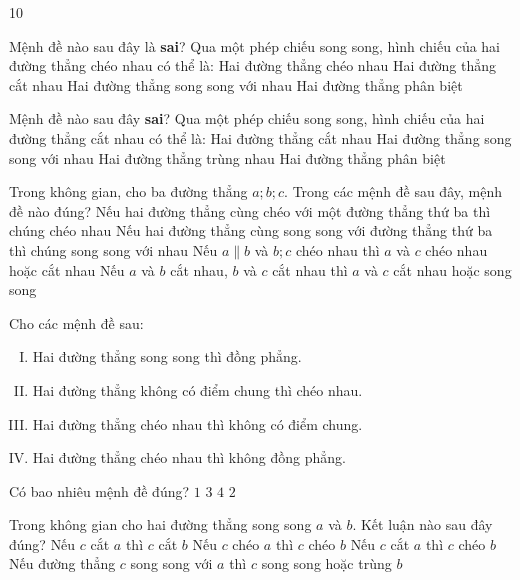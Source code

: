 \begin{indapan}{10}
\begin{ex}
	\loigiai{
	}
\end{ex}
\begin{ex}%
	Mệnh đề nào sau đây là \textbf{sai}? Qua một phép chiếu song song, hình chiếu của hai đường thẳng chéo nhau có thể là:
	\choice
	{\True Hai đường thẳng chéo nhau}
	{Hai đường thẳng cắt nhau}
	{Hai đường thẳng song song với nhau}
	{Hai đường thẳng phân biệt}
	\loigiai{
	}
\end{ex}
\begin{ex}%
	Mệnh đề nào sau đây \textbf{sai}? Qua một phép chiếu song song, hình chiếu của hai đường thẳng cắt nhau có thể là:
	\choice
	{Hai đường thẳng cắt nhau}
	{\True Hai đường thẳng song song với nhau}
	{Hai đường thẳng trùng nhau}
	{Hai đường thẳng phân biệt}
	\loigiai{
	}
\end{ex}
\begin{ex}%
	Trong không gian, cho ba đường thẳng $a;b;c$. Trong các mệnh đề sau đây, mệnh đề nào đúng?
	\choice
	{Nếu hai đường thẳng cùng chéo với một đường thẳng thứ ba thì chúng chéo nhau}
	{Nếu hai đường thẳng cùng song song với đường thẳng thứ ba thì chúng song song với nhau}
	{\True Nếu $a\parallel b$ và $b;c$ chéo nhau thì $a$ và $c$ chéo nhau hoặc cắt nhau}
	{Nếu $a$ và $b$ cắt nhau, $b$ và $c$ cắt nhau thì $a$ và $c$ cắt nhau hoặc song song}
	\loigiai{
	}
\end{ex}
\begin{ex}%
	Cho các mệnh đề sau:
	\begin{enumerate}[(I)]
		\item Hai đường thẳng song song thì đồng phẳng.
		\item Hai đường thẳng không có điểm chung thì chéo nhau.
		\item Hai đường thẳng chéo nhau thì không có điểm chung.
		\item Hai đường thẳng chéo nhau thì không đồng phẳng.
	\end{enumerate}
	Có bao nhiêu mệnh đề đúng?
	\choice
	{$1$}
	{\True $3$}
	{$4$}
	{$2$}
	\loigiai{
	}
\end{ex}
\begin{ex}%
	Trong không gian cho hai đường thẳng song song $a$ và $b$. Kết luận nào sau đây đúng?
	\choice
	{Nếu $c$ cắt $a$ thì $c$ cắt $b$}
	{Nếu $c$ chéo $a$ thì $c$ chéo $b$}
	{Nếu $c$ cắt $a$ thì $c$ chéo $b$}
	{\True Nếu đường thẳng $c$ song song với $a$ thì $c$ song song hoặc trùng $b$}

\end{ex}
\end{indapan}
